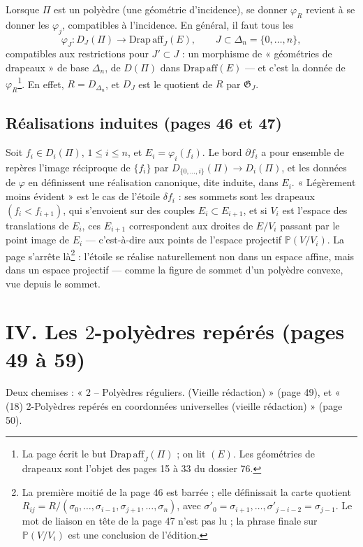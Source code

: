 \documentclass[11pt,a4paper]{article}
\begin{document}
Lorsque $\Pi$ est un polyèdre (une géométrie d'incidence), se donner $\varphi_R$
revient à se donner les $\varphi_j$, compatibles à l'incidence. En général, il
faut tous les
\[
\varphi_J : D_J(\Pi) \to \mathrm{Drap\,aff}_J(E), \qquad J \subset \Delta_n
= \{0, \dots, n\},
\]
compatibles aux restrictions pour $J' \subset J$ : un morphisme de « géométries
de drapeaux » de base $\Delta_n$, de $D(\Pi)$ dans $\mathrm{Drap\,aff}(E)$
--- et c'est la donnée de $\varphi_R$\footnote{La page écrit le but
$\mathrm{Drap\,aff}_J(\Pi)$ ; on lit $(E)$. Les géométries de drapeaux
sont l'objet des pages 15 à 33 du dossier 76.}. En effet, $R = D_{\Delta_n}$,
et $D_J$ est le quotient de $R$ par $\mathfrak{G}_J$.

\subsection*{Réalisations induites (pages 46 et 47)}

Soit $f_i \in D_i(\Pi)$, $1 \leq i \leq n$, et $E_i = \varphi_i(f_i)$. Le bord
$\partial f_i$ a pour ensemble de repères l'image réciproque de $\{f_i\}$ par
$D_{\{0, \dots, i\}}(\Pi) \to D_i(\Pi)$, et les données de $\varphi$ en
définissent une réalisation canonique, dite induite, dans $E_i$. « Légèrement
moins évident » est le cas de l'étoile $\delta f_i$ : ses sommets sont les
drapeaux $(f_i < f_{i+1})$, qui s'envoient sur des couples $E_i \subset
E_{i+1}$, et si $V_i$ est l'espace des translations de $E_i$, ces $E_{i+1}$
correspondent aux droites de $E / V_i$ passant par le point image de $E_i$ ---
c'est-à-dire aux points de l'espace projectif $\mathbb{P}(V / V_i)$. La page
s'arrête là\footnote{La première moitié de la page 46 est barrée ; elle
définissait la carte quotient $R_{ij} = R / (\sigma_0, \dots, \sigma_{i-1},
\sigma_{j+1}, \dots, \sigma_n)$, avec $\sigma'_0 = \sigma_{i+1}, \dots,
\sigma'_{j-i-2} = \sigma_{j-1}$. Le mot de liaison en tête de la page 47 n'est
pas lu ; la phrase finale sur $\mathbb{P}(V / V_i)$ est une conclusion de
l'édition.} : l'étoile se réalise naturellement non dans un espace affine, mais
dans un espace projectif --- comme la figure de sommet d'un polyèdre convexe,
vue depuis le sommet.

\section*{IV. Les $2$-polyèdres repérés (pages 49 à 59)}

Deux chemises : « 2 -- Polyèdres réguliers. (Vieille rédaction) » (page 49), et
« (18) 2-Polyèdres repérés en coordonnées universelles (vieille rédaction) »
(page 50).
\end{document}
